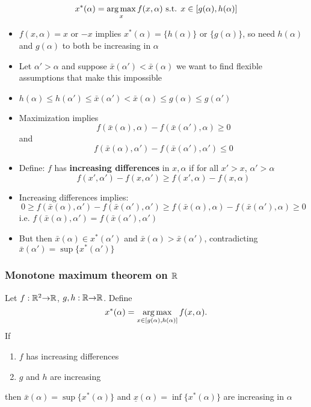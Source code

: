 \begin{frame}
  \[ x^*(\alpha) = \argmax_x f(x,\alpha) \text{ s.t. } x \in
  [g(\alpha),h(\alpha)] \] 
  \begin{itemize}
  \item $f(x,\alpha) = x$ or $-x$ implies $x^*(\alpha) = \{h(\alpha)\}$ or
    $\{g(\alpha)\}$, so need $h(\alpha)$ and $g(\alpha)$ to both be
    increasing in $\alpha$
  \item Let $\alpha' > \alpha$ and suppose $\bar{x}(\alpha')<
    \bar{x}(\alpha)$ we want to find flexible assumptions that make
    this impossible
  \item $h(\alpha) \leq h(\alpha') \leq \bar{x}(\alpha') <
    \bar{x}(\alpha) \leq g(\alpha) \leq g(\alpha')$
  \item Maximization implies
    \[ f(\bar{x}(\alpha),\alpha) - f(\bar{x}(\alpha'),\alpha) \geq 0\]
    and 
    \[ f(\bar{x}(\alpha),\alpha') - f(\bar{x}(\alpha'),\alpha') \leq
    0\]    
  \end{itemize}
\end{frame}

\begin{frame}
  \begin{itemize}
  \item Define: $f$ has \textbf{increasing differences} in $x,\alpha$
    if for all $x'>x$, $\alpha'>\alpha$ 
    \[ f(x',\alpha') - f(x,\alpha') \geq f(x',\alpha) - f(x,\alpha) \]
  \item Increasing differences implies:
    \[ 0 \geq f(\bar{x}(\alpha),\alpha') - f(\bar{x}(\alpha'),\alpha')
    \geq f(\bar{x}(\alpha),\alpha) - f(\bar{x}(\alpha'),\alpha) \geq
    0 \]
    i.e. $f(\bar{x}(\alpha),\alpha')=f(\bar{x}(\alpha'),\alpha')$
  \item But then $\bar{x}(\alpha) \in x^*(\alpha')$ and
    $\bar{x}(\alpha)>\bar{x}(\alpha')$, contradicting
    $\bar{x}(\alpha') = \sup \{x^*(\alpha')\}$
  \end{itemize}
\end{frame}

\begin{frame}
  \frametitle{Monotone maximum theorem on $\mathbb{R}$}
  \begin{theorem}
    Let $f: \mathbb{R}^2 {\rightarrow} \mathbb{R}$, $g,h: \mathbb{R} {\rightarrow} \mathbb{R}$. Define
    \[ x^*(\alpha) = \argmax_{x \in [g(\alpha), h(\alpha)]}
    f(x,\alpha). \]
    If 
    \begin{enumerate}
    \item $f$ has increasing differences
    \item $g$ and $h$ are increasing
    \end{enumerate}
    then $\bar{x}(\alpha) = \sup\{x^*(\alpha)\}$ and
    $\underline{x}(\alpha) = \inf\{x^*(\alpha)\}$ are increasing in
    $\alpha$ 
  \end{theorem}
\end{frame}

